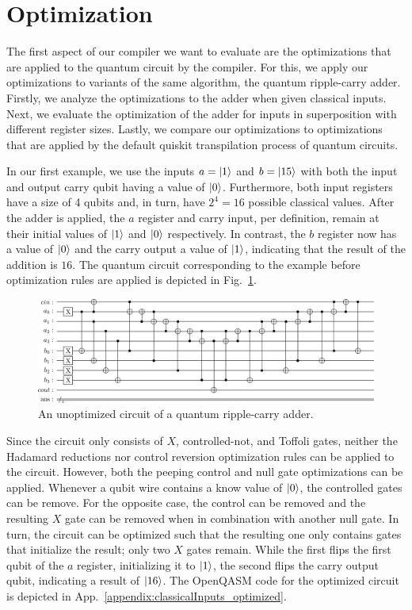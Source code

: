 \section{Optimization}
\label{sec:eval_optimization}
The first aspect of our compiler we want to evaluate are the optimizations that are applied to the quantum circuit by the compiler. For this, we apply our optimizations to variants of the same algorithm, the quantum ripple-carry adder. Firstly, we analyze the optimizations to the adder when given classical inputs. Next, we evaluate the optimization of the adder for inputs in superposition with different register sizes. Lastly, we compare our optimizations to optimizations that are applied by the default quiskit transpilation process of quantum circuits.

In our first example, we use the inputs $a = \ket{1}$ and $b = \ket{15}$ with both the input and output carry qubit having a value of $\ket{0}$. Furthermore, both input registers have a size of 4 qubits and, in turn, have $2^4 = 16$ possible classical values. After the adder is applied, the $a$ register and carry input, per definition, remain at their initial values of $\ket{1}$ and $\ket{0}$ respectively. In contrast, the $b$ register now has a value of $\ket{0}$ and the carry output a value of $\ket{1}$, indicating that the result of the addition is $16$. 
The quantum circuit corresponding to the example before optimization rules are applied is depicted in Fig.~\ref*{fig:eval_adder_circuit}.
\begin{figure}[htp]
    \centering     
    \includegraphics[width=\textwidth]{../figures/images/adderCircuit.png}
    \caption{An unoptimized circuit of a quantum ripple-carry adder.}
    \label{fig:eval_adder_circuit}
\end{figure}

Since the circuit only consists of $X$, controlled-not, and Toffoli gates, neither the Hadamard reductions nor control reversion optimization rules can be applied to the circuit. However, both the peeping control and null gate optimizations can be applied. Whenever a qubit wire contains a know value of $\ket{0}$,  the controlled gates can be remove. For the opposite case, the control can be removed and the resulting $X$ gate can be removed when in combination with another null gate. In turn, the circuit can be optimized such that the resulting one only contains gates that initialize the result; only two $X$ gates remain. While the first flips the first qubit of the $a$ register, initializing it to $\ket{1}$, the second flips the carry output qubit, indicating a result of $\ket{16}$. The OpenQASM code for the optimized circuit is depicted in App.~\ref{appendix:classicalInputs_optimized}.

